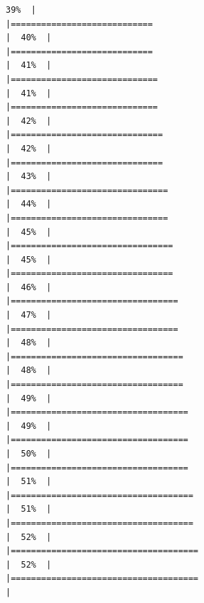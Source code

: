 \documentclass[
  english,
  man,a4paper,mask,floatsintext]{apa6}
\begin{document}
\begin{verbatim}
39%  |                                                                              |============================                                          |  40%  |                                                                              |============================                                          |  41%  |                                                                              |=============================                                         |  41%  |                                                                              |=============================                                         |  42%  |                                                                              |==============================                                        |  42%  |                                                                              |==============================                                        |  43%  |                                                                              |===============================                                       |  44%  |                                                                              |===============================                                       |  45%  |                                                                              |================================                                      |  45%  |                                                                              |================================                                      |  46%  |                                                                              |=================================                                     |  47%  |                                                                              |=================================                                     |  48%  |                                                                              |==================================                                    |  48%  |                                                                              |==================================                                    |  49%  |                                                                              |===================================                                   |  49%  |                                                                              |===================================                                   |  50%  |                                                                              |===================================                                   |  51%  |                                                                              |====================================                                  |  51%  |                                                                              |====================================                                  |  52%  |                                                                              |=====================================                                 |  52%  |                                                                              |=====================================                                 |  
\end{verbatim}
\end{document}
